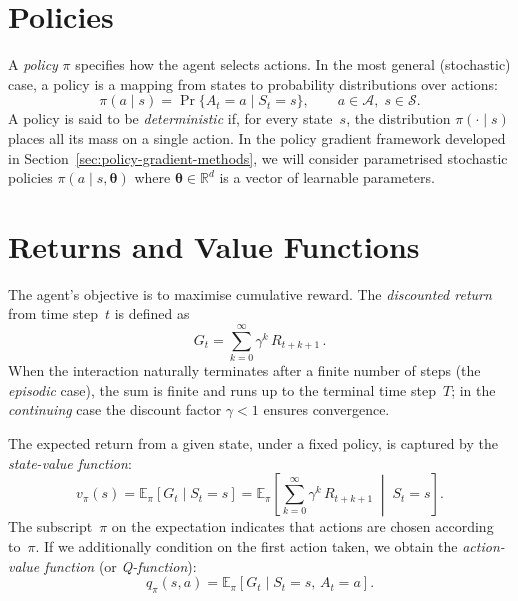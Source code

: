 \documentclass[a4paper,oneside,11pt]{report}
\begin{document}
\section{Policies}
\label{sec:policies}

A \emph{policy} $\pi$ specifies how the agent selects actions. In the most general (stochastic) case, a policy is a mapping from states to probability distributions over actions:
\begin{equation}\label{eq:policy-def}
  \pi(a\mid s) = \Pr\{A_t = a \mid S_t = s\}, \qquad a \in \mathcal{A},\; s \in \mathcal{S}.
\end{equation}
A policy is said to be \emph{deterministic} if, for every state~$s$, the distribution $\pi(\cdot\mid s)$ places all its mass on a single action. In the policy gradient framework developed in Section~\ref{sec:policy-gradient-methods}, we will consider parametrised stochastic policies $\pi(a\mid s, \bm{\theta})$ where $\bm{\theta}\in\mathbb{R}^d$ is a vector of learnable parameters.

\section{Returns and Value Functions}
\label{sec:returns-values}

The agent's objective is to maximise cumulative reward. The \emph{discounted return} from time step~$t$ is defined as
\begin{equation}\label{eq:return}
  G_t = \sum_{k=0}^{\infty} \gamma^k\, R_{t+k+1}\,.
\end{equation}
When the interaction naturally terminates after a finite number of steps (the \emph{episodic} case), the sum is finite and runs up to the terminal time step~$T$; in the \emph{continuing} case the discount factor $\gamma<1$ ensures convergence.

The expected return from a given state, under a fixed policy, is captured by the \emph{state-value function}:
\begin{equation}\label{eq:state-value}
  v_\pi(s) = \mathbb{E}_\pi\!\left[ G_t \mid S_t = s \right] = \mathbb{E}_\pi\!\left[ \sum_{k=0}^{\infty} \gamma^k\, R_{t+k+1} \;\middle|\; S_t = s \right].
\end{equation}
The subscript~$\pi$ on the expectation indicates that actions are chosen according to~$\pi$. If we additionally condition on the first action taken, we obtain the \emph{action-value function} (or \emph{Q-function}):
\begin{equation}\label{eq:action-value}
  q_\pi(s,a) = \mathbb{E}_\pi\!\left[ G_t \mid S_t = s,\, A_t = a \right].
\end{equation}
\end{document}
